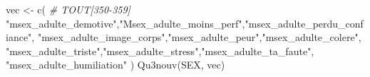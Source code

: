 \documentclass[
]{article}
\newenvironment{Shaded}{\begin{snugshade}}{\end{snugshade}}
\newcommand{\CommentTok}[1]{\textcolor[rgb]{0.56,0.35,0.01}{\textit{#1}}}
\newcommand{\FunctionTok}[1]{\textcolor[rgb]{0.00,0.00,0.00}{#1}}
\newcommand{\NormalTok}[1]{#1}
\newcommand{\OtherTok}[1]{\textcolor[rgb]{0.56,0.35,0.01}{#1}}
\newcommand{\StringTok}[1]{\textcolor[rgb]{0.31,0.60,0.02}{#1}}
\begin{document}
\begin{Shaded}
\begin{Highlighting}[]
\NormalTok{vec }\OtherTok{\textless{}{-}} \FunctionTok{c}\NormalTok{(  }\CommentTok{\# TOUT[350{-}359]}
  \StringTok{"msex\_adulte\_demotive"}\NormalTok{,}\StringTok{"Msex\_adulte\_moins\_perf"}\NormalTok{,}\StringTok{"msex\_adulte\_perdu\_confiance"}\NormalTok{,}
  \StringTok{"msex\_adulte\_image\_corps"}\NormalTok{,}\StringTok{"msex\_adulte\_peur"}\NormalTok{,}\StringTok{"msex\_adulte\_colere"}\NormalTok{,}
  \StringTok{"msex\_adulte\_triste"}\NormalTok{,}\StringTok{"msex\_adulte\_stress"}\NormalTok{,}\StringTok{"msex\_adulte\_ta\_faute"}\NormalTok{,}
  \StringTok{"msex\_adulte\_humiliation"}
\NormalTok{  )}
\FunctionTok{Qu3nouv}\NormalTok{(SEX, vec)}
\end{Highlighting}
\end{Shaded}
\end{document}
